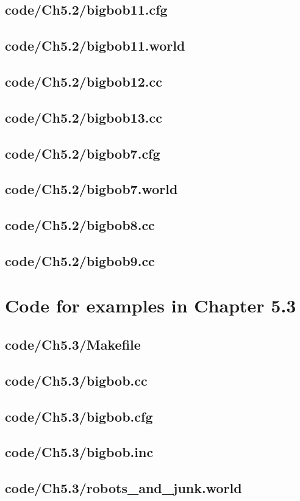 \documentclass[a4paper]{report}
\begin{document}
{\section{code/Ch5.2/bigbob11.cfg}

\section{code/Ch5.2/bigbob11.world}

\section{code/Ch5.2/bigbob12.cc}

\section{code/Ch5.2/bigbob13.cc}

\section{code/Ch5.2/bigbob7.cfg}

\section{code/Ch5.2/bigbob7.world}

\section{code/Ch5.2/bigbob8.cc}

\section{code/Ch5.2/bigbob9.cc}

\chapter{Code for examples in Chapter 5.3}
\section{code/Ch5.3/Makefile}

\section{code/Ch5.3/bigbob.cc}

\section{code/Ch5.3/bigbob.cfg}

\section{code/Ch5.3/bigbob.inc}

\section{code/Ch5.3/robots\_and\_junk.world}

}
\end{document}
